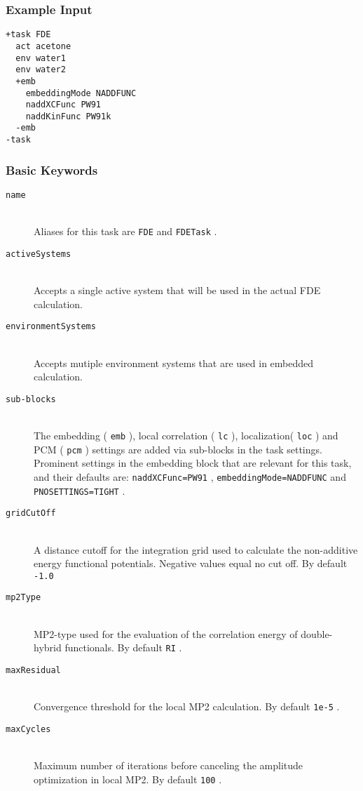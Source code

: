 \documentclass[bibliography=totocnumbered,a4paper,10pt,oneside]{scrbook}
\newcommand{\ttt}[1]{%
  \begingroup\setlength{\fboxsep}{1pt}%
  \colorbox{serenity-green!30}{\texttt{\hspace*{2pt}\vphantom{(g}#1\hspace*{2pt}}}%
  \endgroup
}
\begin{document}
\subsubsection{Example Input}
\begin{lstlisting}
+task FDE
  act acetone
  env water1
  env water2
  +emb
    embeddingMode NADDFUNC
    naddXCFunc PW91
    naddKinFunc PW91k
  -emb
-task
\end{lstlisting}
\subsubsection{Basic Keywords}
\begin{description}
	 \item [\texttt{name}]\hfill \\
	Aliases for this task are \ttt{FDE} and \ttt{FDETask}.
	\item [\texttt{activeSystems}]\hfill \\
	Accepts a single active system that will be used in the actual FDE calculation.
	\item [\texttt{environmentSystems}]\hfill \\
	Accepts mutiple environment systems that are used in embedded calculation.
	\item [\texttt{sub-blocks}]\hfill \\
	The embedding (\ttt{emb}), local correlation (\ttt{lc}), localization(\ttt{loc}) and PCM (\ttt{pcm}) settings are added via sub-blocks in the task settings.
	Prominent settings in the embedding block that are relevant for this task, and their defaults are:
	\ttt{naddXCFunc=PW91}, \ttt{embeddingMode=NADDFUNC} and \ttt{PNOSETTINGS=TIGHT}.
	\item [\texttt{gridCutOff}] \hfill \\
    A distance cutoff for the integration grid used to calculate the non-additive  energy functional potentials. Negative values equal no cut off. By default \ttt{-1.0}
	\item [\texttt{mp2Type}] \hfill \\
	MP2-type used for the evaluation of the correlation energy of double-hybrid functionals. By default \ttt{RI}.
	\item [\texttt{maxResidual}] \hfill \\
	Convergence threshold for the local MP2 calculation. By default \ttt{1e-5}.
	\item [\texttt{maxCycles}] \hfill \\
	Maximum number of iterations before canceling the amplitude optimization in local MP2. By default \ttt{100}.

\end{description}
\end{document}
